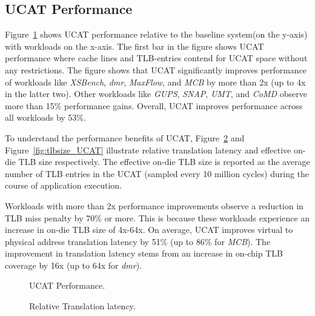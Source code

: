\subsection{UCAT Performance}


\noindent Figure~\ref{fig:perf_UCAT} shows UCAT performance relative
to the baseline system(on the y-axis) with workloads on the x-axis.
The first bar in the figure shows UCAT performance where cache lines
and TLB-entries contend for UCAT space without any restrictions. The
figure shows that UCAT significantly improves performance of workloads
like {\em XSBench}, {\em dmr}, {\em MaxFlow}, and {\em MCB} by more
than 2x (up to 4x in the latter two). Other workloads like {\em GUPS},
{\em SNAP}, {\em UMT}, and {\em CoMD} observe more than 15\%
performance gains. Overall, UCAT improves performance across all
workloads by 53\%.

To understand the performance benefits of UCAT,
Figure~\ref{fig:tlblat_UCAT} and Figure~\ref{fig:tlbsize_UCAT}
illustrate relative translation latency and effective on-die TLB size
respectively. The effective on-die TLB size is reported as the average
number of TLB entries in the UCAT (sampled every 10 million cycles)
during the course of application execution.

Workloads with more than 2x performance improvements observe a
reduction in TLB miss penalty by 70\% or more. This is because these
workloads experience an increase in on-die TLB size of 4x-64x. On
average, UCAT improves virtual to physical address translation latency
by 51\% (up to 86\% for {\em MCB}). The improvement in translation
latency stems from an increase in on-chip TLB coverage by 16x (up to
64x for {\em dmr}).

\begin{figure}[tp] 
  \vspace{-0.in} \centering
  \centerline{}

  \caption{\small UCAT Performance. \normalsize}
  \label{fig:perf_UCAT} 
  \vspace{0.1 in}
\end{figure}

\begin{figure}[tp] 
  \vspace{0.1in} \centering
  \centerline{}

  \caption{\small Relative Translation latency.\normalsize}
  \label{fig:tlblat_UCAT} 
  \vspace{-0.0 in}
\end{figure}

